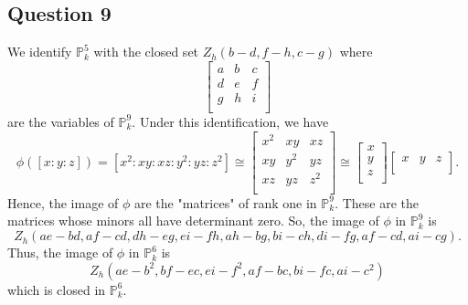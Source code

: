 \documentclass{article}
\newcommand{\PP}{\mathbb{P}}
\begin{document}
\subsection*{Question 9} 
We identify $\PP^5_k$ with the closed set $Z_h(b-d,f-h,c-g)$ where 
$$
\begin{bmatrix}
    a &b  &c\\
    d  &e &f\\
    g  &h &i\\
\end{bmatrix} 
$$
are the variables of $\PP^9_k$. Under this identification, we have 
$$
\phi([x:y:z]) = [x^2:xy:xz:y^2:yz:z^2] \cong  
\begin{bmatrix}
    x^2 &xy  &xz\\
    xy  &y^2 &yz\\
    xz  &yz  &z^2\\
\end{bmatrix} 
\cong  
\begin{bmatrix}
    x\\y\\z\\
\end{bmatrix}
\begin{bmatrix}
    x &y &z\\
\end{bmatrix}.
$$ Hence, the image of $\phi$ are the "matrices" of rank one in $\PP^9_k$. 
These are the matrices whose minors all have determinant zero. 
So, the image of $\phi$ in $\PP^9_k$ is $$Z_h(ae-bd,af-cd,dh-eg,ei-fh,ah-bg,bi-ch,di-fg,af-cd,ai-cg).$$ 
Thus, the image of $\phi$ in $\PP^6_k$ is $$ Z_h(ae-b^2,bf-ec,ei-f^2,af-bc,bi-fc,ai-c^2)$$ 
which is closed in $\PP^6_k$. 
\end{document}

